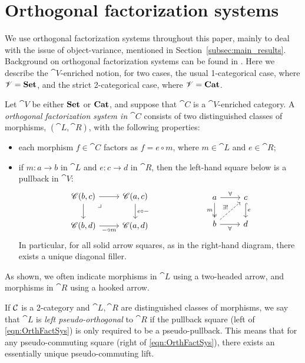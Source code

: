 \documentclass[11pt,oneside,article]{memoir}
\begin{document}
\section{Orthogonal factorization systems}

We use orthogonal factorization systems throughout this paper, mainly to deal with the issue of object-variance, mentioned in Section~\ref{subsec:main_results}. Background on orthogonal factorization systems can be found in \cite[Chapter 5.5]{BorceuxV1}. Here we describe the $\cat{V}$-enriched notion, for two cases, the usual 1-categorical case, where $\mathscr{V}=\mathbf{Set}$, and the strict 2-categorical case, where $\mathscr{V}=\mathbf{Cat}$.

\begin{definition}\label{def:orthogonal}
Let $\cat{V}$ be either $\mathbf{Set}$ or $\mathbf{Cat}$, and suppose that $\cat{C}$ is a $\cat{V}$-enriched category. A \emph{orthogonal factorization system in $\cat{C}$} consists of two distinguished classes of morphisms, $(\cat{L},\cat{R})$, with the following properties:
\begin{itemize}
\item each morphism $f\in\cat{C}$ factors as $f=e\circ m$, where $m\in\cat{L}$ and $e\in\cat{R}$;
\item if $m\colon a\to b$ in $\cat{L}$ and $e\colon c\to d$ in $\cat{R}$, then the left-hand square below is a pullback in $\cat{V}$:
\begin{equation}\label{eqn:OrthFactSys}
\begin{tikzcd}
\cat{C}(b,c)\ar[r]\ar[d]\ar[rd,phantom,"\lrcorner" very near start]&\cat{C}(a,c)\ar[d,"e\circ -"]\\
\cat{C}(b,d)\ar[r,"-\circ m"']&\cat{C}(a,d)
\end{tikzcd}
\hspace{.9in}
\begin{tikzcd}
a\ar[r,"\forall"]\ar[d,two heads,"m"']&c\ar[d,hook, "e"]\\
b\ar[r,"\forall"']\ar[ur,dashed,"\exists!"]&d
\end{tikzcd}
\end{equation}
In particular, for all solid arrow squares, as in the right-hand diagram, there exists a unique diagonal filler. 
\end{itemize}
As shown, we often indicate morphisms in $\cat{L}$ using a two-headed arrow, and morphisms in $\cat{R}$ using a hooked arrow.
\end{definition}

If $\mathcal{C}$ is a 2-category and $\cat{L}, \cat{R}$ are distinguished classes of morphisms, we say that $\cat{L}$ is \emph{left pseudo-orthogonal} to $\cat{R}$ if the pullback square (left of \eqref{eqn:OrthFactSys}) is only required to be a pseudo-pullback. This means that for any pseudo-commuting square (right of \eqref{eqn:OrthFactSys}), there exists an essentially unique pseudo-commuting lift.
\end{document}

